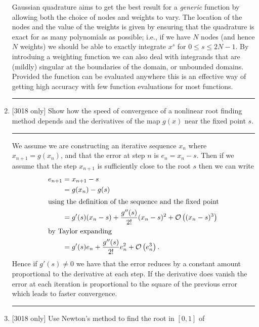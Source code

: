 \documentclass[10pt]{article}
\begin{document}
\begin{enumerate}
  Gaussian quadrature aims to get the best result for a \emph{generic}
  function by allowing both the choice of nodes and weights to
  vary. The location of the nodes and the value of the weights is
  given by ensuring that the quadrature is exact for as many
  polynomials as possible; i.e., if we have $N$ nodes (and hence $N$
  weights) we should be able to exactly integrate $x^s$ for $0 \le s
  \le 2N - 1$. By introduing a weighting function we can also deal
  with integrands that are (mildly) singular at the boundaries of the
  domain, or unbounded domains. Provided the function can be evaluated
  anywhere this is an effective way of getting high accuracy with few
  function evaluations for most functions.
  \begin{center}
    \rule{0.9\textwidth}{.1pt}
  \end{center}
\item{} [3018 only] Show how the speed of convergence of a nonlinear
  root finding method depends and the derivatives of the map $g(x)$
  near the fixed point $s$.
  \begin{center}
    \rule{0.9\textwidth}{.1pt}
  \end{center}
  We assume we are constructing an iterative sequence $x_n$ where
  $x_{n+1} = g(x_n)$, and that the error at step $n$ is $e_n = x_n -
  s$. Then if we assume that the step $x_{n+1}$ is sufficiently close
  to the root $s$ then we can write
  \begin{align*}
    e_{n+1} & = x_{n+1} - s \\
    & = g(x_n) - g(s) \\ 
    \intertext{using the definition of the sequence and the fixed
      point}
    & = g'(s) (x_n -s) + \frac{g''(s)}{2!} (x_n - s)^2 + {\cal O}
    \left( (x_n - s)^3 \right) \\
    \intertext{by Taylor expanding}
    & = g'(s) e_n + \frac{g''(s)}{2!} e_n^2 + {\cal O} \left( e_n^3
    \right).
  \end{align*}
  Hence if $g'(s) \ne 0$ we have that the error reduces by a constant
  amount proportional to the derivative at each step. If the
  derivative does vanish the error at each iteration is proportional
  to the square of the previous error which leads to faster
  convergence. 
  \begin{center}
    \rule{0.9\textwidth}{.1pt}
  \end{center}
\item{} [3018 only] Use Newton's method to find the root in $[0,1]$ of
  \begin{equation*}

\end{equation*}
\end{enumerate}
\end{document}
